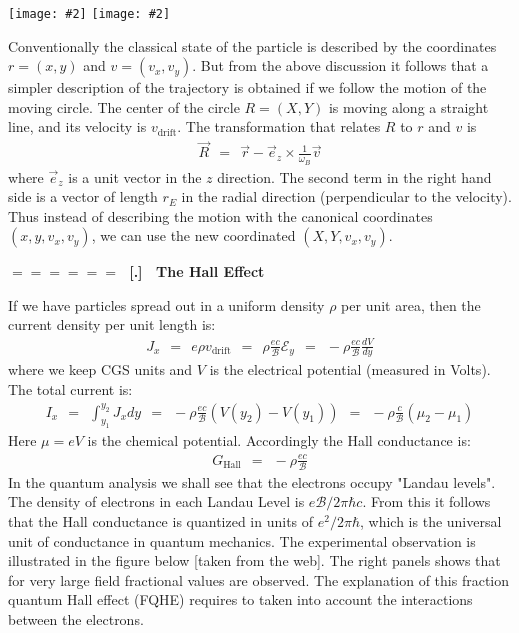 \documentclass[onecolumn,fleqn]{revtex4}
\newcommand{\putgraphv}[2][0.30\hsize]{\texttt{[image: \#2]}}
\newcommand{\beq}{\begin{eqnarray}}
\newcommand{\eeq}{\end{eqnarray}}
\renewcommand{\thesubsection}{\arabic{subsection}}
\renewcommand{\thesubsubsection}{\arabic{subsubsection}}
\newcommand{\sheadC}[1]
{
\addtocounter{subsubsection}{1}
\vspace{5mm}
{\Large\bf $=\!=\!=\!=\!=\!=\;$ [\thesubsection.\thesubsubsection] \ #1}  
\nopagebreak
\phantomsection
}
\begin{document}
\begin{center}
\putgraphv[0.25\hsize]{Cycloid} 
\putgraphv[0.25\hsize]{CycloidR} 
\end{center}




Conventionally the classical state of the particle 
is described by the coordinates ${r=(x,y)}$
and ${v=(v_x,v_y)}$. 
But from the above discussion it follows that a simpler 
description of the trajectory is obtained if we follow 
the motion of the moving circle. 
The center of the circle ${R=(X,Y)}$ 
is moving along a straight line, 
and its velocity is ${v_{\mbox{drift}}}$. 
The transformation that relates $R$ 
to ${r}$ and ${v}$ is 
\beq
\vec{R} \ \ = \ \ \vec{r} - \vec{e}_z \times \frac{1}{\omega_B}\vec{v}
\eeq
where $\vec{e}_z$ is a unit vector in the $z$ direction.
The second term in the right hand side is 
a vector of length $r_E$ in the radial direction 
(perpendicular to the velocity).
Thus instead of describing the motion with the canonical 
coordinates ${(x,y,v_x,v_y)}$, we can use 
the new coordinated ${(X,Y,v_x,v_y)}$.




\sheadC{The Hall Effect} 

If we have particles spread out in a uniform 
density ${\rho}$ per unit area, then  
the current density per unit length is:
\beq
J_x \ \ = \ \ e \rho v_{\mbox{drift}} 
\ \ = \ \ \rho \frac{ec}{\mathcal{B}}\mathcal{E}_y 
\ \ = \ \ - \rho \frac{ec}{\mathcal{B}} \frac{dV}{dy} 
\eeq
where we keep CGS units and $V$ is the electrical potential (measured in Volts). 
The total current is:
\beq
I_x \ \ = \ \ \int_{y_1}^{y_2} J_x dy 
\ \ = \ \ - \rho \frac{ec}{\mathcal{B}} ( V(y_2) - V(y_1) ) 
\ \ = \ \ - \rho \frac{c}{\mathcal{B}} ( \mu_2 - \mu_1 )
\eeq
Here $\mu=eV$ is the chemical potential.
Accordingly the Hall conductance is:
\beq
G_{\mbox{Hall}} \ \ = \ \ - \rho \frac{ec}{\mathcal{B}} 
\eeq
In the quantum analysis we shall see that the electrons 
occupy "Landau levels". The density of electrons 
in each Landau Level is ${{e\mathcal{B}}/{2\pi\hbar c}}$. 
From this it follows that the Hall conductance is quantized 
in units of ${e^2/{2\pi\hbar}}$, which is the universal 
unit of conductance in quantum mechanics. 
The experimental observation is illustrated in the 
figure below [taken from the web]. The right panels shows 
that for very large field fractional values are observed.
The explanation of this fraction quantum Hall effect (FQHE) 
requires to taken into account the interactions between the electrons.  
  
\end{document}
